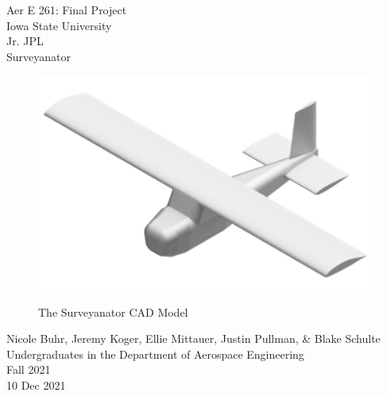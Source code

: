 \documentclass[12pt,A4paper]{article}
\begin{document}
	\thispagestyle{empty}
	\begin{center}
		\Huge
		Aer E 261: Final Project \\
		Iowa State University \\
		Jr. JPL \\
		Surveyanator \\
		\vspace{0.25 in}
		
		
		\begin{figure}[!h]
			\centering
			\vspace{0.5 in}
			\includegraphics[width=1\textwidth]{IsoCad.png}
			\label{fig:f1}
			\caption{The Surveyanator CAD Model}
		\end{figure}
		\vspace*{\fill}
		\large
		Nicole Buhr, Jeremy Koger, Ellie Mittauer, Justin Pullman, \& Blake Schulte \\
		\vspace{0.25 in}
		Undergraduates in the Department of Aerospace Engineering \\
		Fall 2021 \\
		10 Dec 2021 
		\clearpage
	\end{center}

	
	\setcounter{page}{2}
	
	\tableofcontents

	\renewcommand\listfigurename{List of Illustrations}
	\listoffigures

	\clearpage
\end{document}
